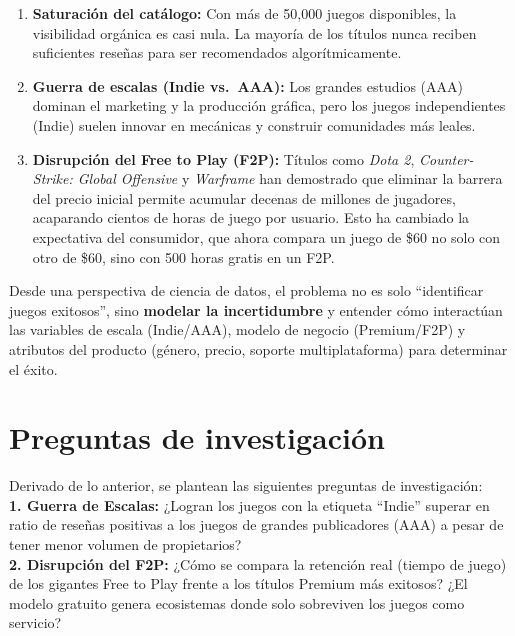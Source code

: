 \documentclass[oneside,11pt]{Latex/Classes/PhDthesisPSnPDF}
\begin{document}
\begin{enumerate}
\def\labelenumi{\arabic{enumi}.}
\item
  \textbf{Saturación del catálogo:} Con más de 50,000 juegos
  disponibles, la visibilidad orgánica es casi nula. La mayoría de los
  títulos nunca reciben suficientes reseñas para ser recomendados
  algorítmicamente.
\item
  \textbf{Guerra de escalas (Indie vs.~AAA):} Los grandes estudios (AAA)
  dominan el marketing y la producción gráfica, pero los juegos
  independientes (Indie) suelen innovar en mecánicas y construir
  comunidades más leales.
\item
  \textbf{Disrupción del Free to Play (F2P):} Títulos como \emph{Dota
  2}, \emph{Counter-Strike: Global Offensive} y \emph{Warframe} han
  demostrado que eliminar la barrera del precio inicial permite acumular
  decenas de millones de jugadores, acaparando cientos de horas de juego
  por usuario. Esto ha cambiado la expectativa del consumidor, que ahora
  compara un juego de \$60 no solo con otro de \$60, sino con 500 horas
  gratis en un F2P.
\end{enumerate}

Desde una perspectiva de ciencia de datos, el problema no es solo
``identificar juegos exitosos'', sino \textbf{modelar la incertidumbre}
y entender cómo interactúan las variables de escala (Indie/AAA), modelo
de negocio (Premium/F2P) y atributos del producto (género, precio,
soporte multiplataforma) para determinar el éxito.

\section{Preguntas de investigación}

Derivado de lo anterior, se plantean las siguientes preguntas de
investigación:\\

\textbf{1. Guerra de Escalas:} ¿Logran los juegos con la etiqueta
``Indie'' superar en ratio de reseñas positivas a los juegos de grandes
publicadores (AAA) a pesar de tener menor volumen de propietarios?\\

\textbf{2. Disrupción del F2P:} ¿Cómo se compara la retención real
(tiempo de juego) de los gigantes Free to Play frente a los títulos
Premium más exitosos? ¿El modelo gratuito genera ecosistemas donde solo
sobreviven los juegos como servicio?\\
\end{document}
